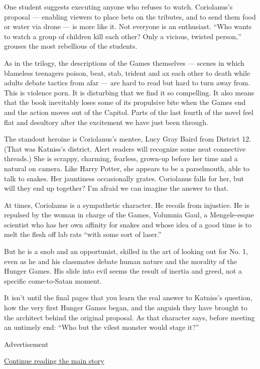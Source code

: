 One student suggests executing anyone who refuses to watch. Coriolanus's
proposal --- enabling viewers to place bets on the tributes, and to send
them food or water via drone --- is more like it. Not everyone is an
enthusiast. ``Who wants to watch a group of children kill each other?
Only a vicious, twisted person,'' grouses the most rebellious of the
students.

As in the trilogy, the descriptions of the Games themselves --- scenes
in which blameless teenagers poison, beat, stab, trident and ax each
other to death while adults debate tactics from afar --- are hard to
read but hard to turn away from. This is violence porn. It is disturbing
that we find it so compelling. It also means that the book inevitably
loses some of its propulsive bite when the Games end and the action
moves out of the Capitol. Parts of the last fourth of the novel feel
flat and desultory after the excitement we have just been through.

The standout heroine is Coriolanus's mentee, Lucy Gray Baird from
District 12. (That was Katniss's district. Alert readers will recognize
some neat connective threads.) She is scrappy, charming, fearless,
grown-up before her time and a natural on camera. Like Harry Potter, she
appears to be a parselmouth, able to talk to snakes. Her jauntiness
occasionally grates. Coriolanus falls for her, but will they end up
together? I'm afraid we can imagine the answer to that.

At times, Coriolanus is a sympathetic character. He recoils from
injustice. He is repulsed by the woman in charge of the Games, Volumnia
Gaul, a Mengele-esque scientist who has her own affinity for snakes and
whose idea of a good time is to melt the flesh off lab rats ``with some
sort of laser.''

But he is a snob and an opportunist, skilled in the art of looking out
for No. 1, even as he and his classmates debate human nature and the
morality of the Hunger Games. His slide into evil seems the result of
inertia and greed, not a specific come-to-Satan moment.

It isn't until the final pages that you learn the real answer to
Katniss's question, how the very first Hunger Games began, and the
anguish they have brought to the architect behind the original proposal.
As that character says, before meeting an untimely end: ``Who but the
vilest monster would stage it?''

Advertisement

\protect\hyperlink{after-bottom}{Continue reading the main story}

